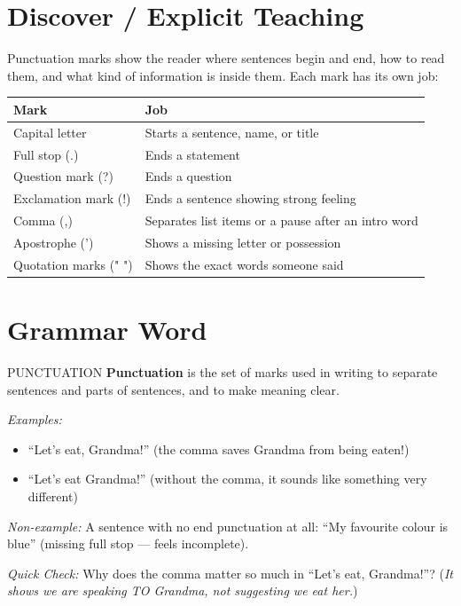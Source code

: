 \section{Discover / Explicit Teaching}
Punctuation marks show the reader where sentences begin and end, how to read them, and what kind of information is inside them. Each mark has its own job:

\begin{table}[h!]
\centering
\begin{tabular}{|l|l|}
\hline
\textbf{Mark} & \textbf{Job} \\
\hline
Capital letter & Starts a sentence, name, or title \\
Full stop (.) & Ends a statement \\
Question mark (?) & Ends a question \\
Exclamation mark (!) & Ends a sentence showing strong feeling \\
Comma (,) & Separates list items or a pause after an intro word \\
Apostrophe (') & Shows a missing letter or possession \\
Quotation marks (" ") & Shows the exact words someone said \\
\hline
\end{tabular}
\end{table}

\section{Grammar Word}
\begin{grammarword}{PUNCTUATION}
\textbf{Punctuation} is the set of marks used in writing to separate sentences and parts of sentences, and to make meaning clear.

\textit{Examples:}
\begin{itemize}
    \item ``Let's eat, Grandma!'' (the comma saves Grandma from being eaten!)
    \item ``Let's eat Grandma!'' (without the comma, it sounds like something very different)
\end{itemize}

\textit{Non-example:} A sentence with no end punctuation at all: ``My favourite colour is blue'' (missing full stop --- feels incomplete).

\textit{Quick Check:} Why does the comma matter so much in ``Let's eat, Grandma!''? (\textit{It shows we are speaking TO Grandma, not suggesting we eat her.})
\end{grammarword}

